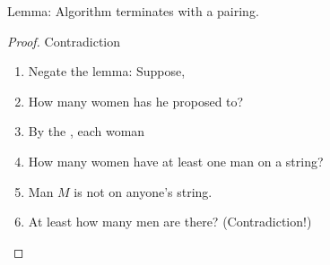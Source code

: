 \question Lemma: Algorithm terminates with a pairing. \newline

\begin{solution}[2.8 in]
\begin{proof} Contradiction
\begin{enumerate}[itemsep=4mm]
\item Negate the lemma: Suppose, \underline{} \newline \underline{}
\item How many women has he proposed to? \underline{}
\item  By the \underline{}, each woman  
\underline{} \newline 
\underline{}
\item How many women have at least one man on a string? 
\underline{}
\item Man $M$ is not on anyone's string.
\item At least how many men are there? \underline{}	  
(Contradiction!) 
\end{enumerate}
\end{proof}
\end{solution}